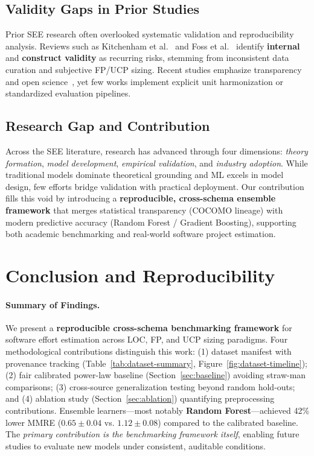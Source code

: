 \documentclass{ieeeaccess}
\begin{document}
\subsection{Validity Gaps in Prior Studies}

Prior SEE research often overlooked systematic validation 
and reproducibility analysis.  
Reviews such as Kitchenham et al.~\cite{kitchenham2001evaluating} 
and Foss et al.~\cite{foss2003bias} identify 
\textbf{internal} and \textbf{construct validity} as recurring risks, 
stemming from inconsistent data curation and subjective FP/UCP sizing.  
Recent studies emphasize transparency and open science~\cite{nair2020open,cruz2019open}, 
yet few works implement explicit unit harmonization 
or standardized evaluation pipelines.
\subsection{Research Gap and Contribution}

Across the SEE literature, research has advanced through four dimensions:
\textit{theory formation}, \textit{model development}, 
\textit{empirical validation}, and \textit{industry adoption}.  
While traditional models dominate theoretical grounding 
and ML excels in model design, 
few efforts bridge validation with practical deployment.  
Our contribution fills this void by introducing a 
\textbf{reproducible, cross-schema ensemble framework} 
that merges statistical transparency (COCOMO lineage) 
with modern predictive accuracy (Random Forest / Gradient Boosting), 
supporting both academic benchmarking and 
real-world software project estimation.


\section{Conclusion and Reproducibility}

\paragraph{Summary of Findings.}
We present a \textbf{reproducible cross-schema benchmarking framework} for software effort estimation across LOC, FP, and UCP sizing paradigms.
Four methodological contributions distinguish this work:
(1) dataset manifest with provenance tracking (Table~\ref{tab:dataset-summary}, Figure~\ref{fig:dataset-timeline});
(2) fair calibrated power-law baseline (Section~\ref{sec:baseline}) avoiding straw-man comparisons;
(3) cross-source generalization testing beyond random hold-outs; and
(4) ablation study (Section~\ref{sec:ablation}) quantifying preprocessing contributions.
Ensemble learners---most notably \textbf{Random Forest}---achieved 42\% lower MMRE ($0.65 \pm 0.04$ vs. $1.12 \pm 0.08$) compared to the calibrated baseline. The \emph{primary contribution is the benchmarking framework itself}, enabling future studies to evaluate new models under consistent, auditable conditions.
\end{document}
